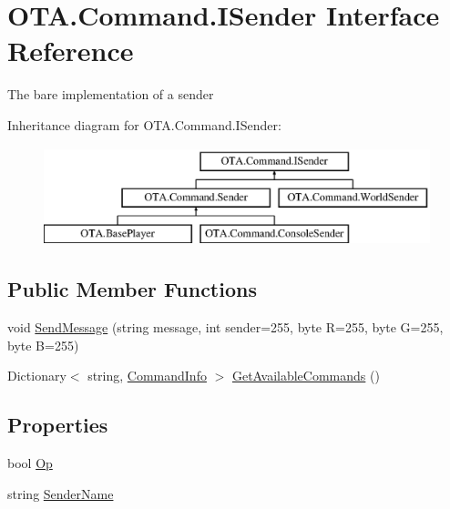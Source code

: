 \hypertarget{interface_o_t_a_1_1_command_1_1_i_sender}{}\section{O\+T\+A.\+Command.\+I\+Sender Interface Reference}
\label{interface_o_t_a_1_1_command_1_1_i_sender}


The bare implementation of a sender  


Inheritance diagram for O\+T\+A.\+Command.\+I\+Sender\+:\begin{figure}[H]
\begin{center}
\leavevmode
\includegraphics[height=2.857143cm]{interface_o_t_a_1_1_command_1_1_i_sender}
\end{center}
\end{figure}
\subsection*{Public Member Functions}
\begin{DoxyCompactItemize}
\item 
void \hyperlink{interface_o_t_a_1_1_command_1_1_i_sender_a7e323ee3ab2f55876bc92a9d681d2bdf}{Send\+Message} (string message, int sender=255, byte R=255, byte G=255, byte B=255)
\item 
Dictionary$<$ string, \hyperlink{class_o_t_a_1_1_command_1_1_command_info}{Command\+Info} $>$ \hyperlink{interface_o_t_a_1_1_command_1_1_i_sender_acc469381ec0e6f18ccf50c213d5095a4}{Get\+Available\+Commands} ()
\end{DoxyCompactItemize}
\subsection*{Properties}
\begin{DoxyCompactItemize}
\item 
bool \hyperlink{interface_o_t_a_1_1_command_1_1_i_sender_a0f976299ffb288c46449ffb1bf61308b}{Op}
\item 
string \hyperlink{interface_o_t_a_1_1_command_1_1_i_sender_a27b05ff3ef4c1a9aac594e3e60d768f8}{Sender\+Name}
\end{DoxyCompactItemize}


